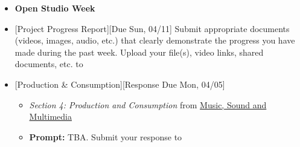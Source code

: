 \def\dMon{Mon, 04/05}
\def\dTues{Tues, 04/06}
\def\dWed{Wed, 04/07}
\def\dThur{Thur, 04/08}
\def\dFri{Fri, 04/09}
\def\dSat{Sat, 04/10}
\def\dSun{Sun, 04/11}
\placeDate

\begin{itemize}[noitemsep,topsep=0pt,leftmargin=*]
    \item \textcolor{defaultColor}{\textbf{Open Studio Week}}
    \item {}[Project Progress Report][Due \dSun] \newline
          Submit appropriate documents (videos, images, audio, etc.) that clearly demonstrate the progress you have made during the past week. Upload your file(s), video links, shared documents, etc. to \discordE
    \item {}[Production \& Consumption][Response Due \dMon]
          \begin{itemize}
              \item \emph{Section 4: Production and Consumption} from \href{supplements/Music_Sound_and_Multimedia_-_From_the_Live_to_the_Virtual_(Music_and_the_Moving_Image)_(2008).pdf}{Music, Sound and Multimedia}
              \item \textbf{Prompt:} TBA. Submit your response to \discordR
          \end{itemize}
\end{itemize}